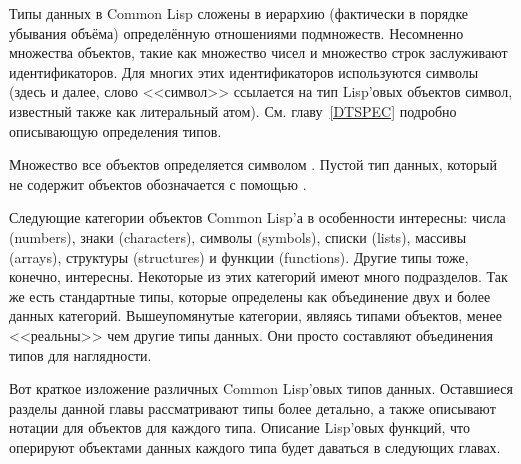 Типы данных в Common Lisp сложены в иерархию (фактически в порядке
убывания объёма) определённую отношениями подмножеств. Несомненно
множества объектов, такие как множество чисел и множество строк
заслуживают идентификаторов. Для многих этих идентификаторов
используются символы (здесь и далее, слово <<символ>> ссылается на
тип Lisp'овых объектов символ, известный также как литеральный
атом). См. главу~\ref{DTSPEC} подробно описывающую определения
типов. 

Множество все объектов определяется символом {\true}. Пустой тип
данных, который не содержит объектов обозначается с помощью
{\nil}. 

Следующие категории объектов Common Lisp'а в особенности
интересны: числа (numbers), знаки (characters), символы (symbols),
списки (lists), массивы (arrays), структуры (structures) и функции
(functions). Другие типы тоже, конечно, интересны. Некоторые из
этих категорий имеют много подразделов. Так же есть стандартные
типы, которые определены как объединение двух и более данных
категорий. Вышеупомянутые категории, являясь типами объектов, менее
<<реальны>> чем другие типы данных. Они просто
составляют объединения типов для наглядности. 

Вот краткое изложение различных Common Lisp'овых типов
данных. Оставшиеся разделы данной главы рассматривают типы более
детально, а также описывают нотации для объектов для каждого
типа. Описание Lisp'овых функций, что оперируют объектами данных
каждого типа будет даваться в следующих главах. 

